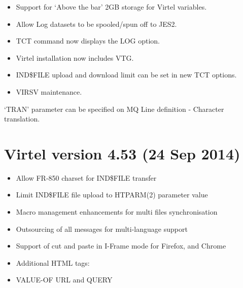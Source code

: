 \documentclass[letterpaper,10pt,english]{sphinxmanual}
\begin{document}
\begin{itemize}
\item {} 
Support for ‘Above the bar’ 2GB storage for Virtel variables.

\item {} 
Allow Log datasets to be spooled/spun off to JES2.

\item {} 
TCT command now displays the LOG option.

\item {} 
Virtel installation now includes VTG.

\item {} 
IND\$FILE upload and download limit can be set in new TCT options.

\item {} 
VIRSV maintenance.

\end{itemize}


‘TRAN’ parameter can be specified on MQ Line definition - Character translation.


\section{Virtel version 4.53 (24 Sep 2014)}
\label{\detokenize{Installation_Guide:virtel-version-4-53-24-sep-2014}}
\begin{itemize}
\item {} 
Allow FR-850 charset for IND\$FILE transfer

\item {} 
Limit IND\$FILE file upload to HTPARM(2) parameter value

\item {} 
Macro management enhancements for multi files synchronisation

\item {} 
Outsourcing of all messages for multi-language support

\item {} 
Support of cut and paste in I-Frame mode for Firefox, and Chrome

\item {} 
Additional HTML tags:

\item {} 
VALUE-OF URL and QUERY

\end{itemize}
\end{document}
